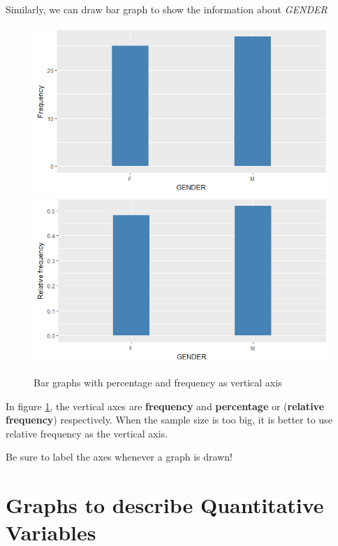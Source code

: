 \documentclass[a4paper, 12pt,twoside]{book}
\begin{document}
\begin{itemize}
Similarly, we can draw bar graph to show the information about \textit{GENDER}
    \begin{figure}[H]
      \centering
        \includegraphics[scale=0.4]{Bargraph1.png}
        \includegraphics[scale=0.4]{Bargraph2.png}       
          \caption{Bar graphs with percentage and frequency as vertical axis} 
          \label{bargraph}
    \end{figure}    
 In figure \ref{bargraph}, the vertical axes are \textbf{frequency} and  \textbf{percentage} or (\textbf{relative frequency}) respectively. When the sample size is too big, it is better to use relative frequency as the vertical axis.\vspace{0.6cm}\\
\colorbox{babypink}{\parbox{14.2cm}{Be sure to label the axes whenever a graph is drawn!}}

\end{itemize}
\newpage

\section{{Graphs to describe Quantitative Variables}}
\end{document}
